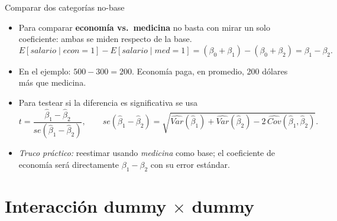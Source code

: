 \documentclass{beamer}
\begin{document}
\begin{frame}{Comparar dos categorías no-base}
\begin{itemize}
    \item Para comparar \textbf{economía vs.\ medicina} no basta con mirar un solo coeficiente: ambas se miden respecto de la base.
    \[
    E[salario\mid econ=1] - E[salario\mid med=1] = (\beta_0+\beta_1)-(\beta_0+\beta_2)=\beta_1-\beta_2.
    \]
    \item En el ejemplo: $500-300=200$. Economía paga, en promedio, 200 dólares más que medicina.
    \pause
    \item Para testear si la diferencia es significativa se usa
    \[
    t=\frac{\hat\beta_1-\hat\beta_2}{se(\hat\beta_1-\hat\beta_2)},\qquad
    se(\hat\beta_1-\hat\beta_2)=\sqrt{\widehat{Var}(\hat\beta_1)+\widehat{Var}(\hat\beta_2)-2\,\widehat{Cov}(\hat\beta_1,\hat\beta_2)}.
    \]
    \item \textit{Truco práctico:} reestimar usando \emph{medicina} como base; el coeficiente de economía será directamente $\beta_1-\beta_2$ con su error estándar.
\end{itemize}
\end{frame}

\section{Interacción dummy $\times$ dummy}
\end{document}
